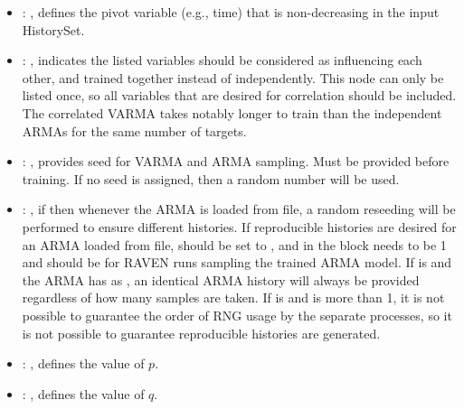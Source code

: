 \begin{itemize}
    \item {}: , 
      defines the pivot variable (e.g., time) that is non-decreasing in
      the input HistorySet.

    \item {}: , 
      indicates the listed variables                                                    should be
      considered as influencing each other, and trained together instead of independently.  This
      node                                                    can only be listed once, so all
      variables that are desired for correlation should be included.  \nb The
      correlated VARMA takes notably longer to train than the independent ARMAs for the same number
      of targets.

    \item {}: , 
      provides seed for VARMA and ARMA sampling.
      Must be provided before training. If no seed is assigned,
      then a random number will be used.

    \item {}: , 
      if  then whenever the ARMA is loaded from file, a
      random reseeding will be performed to ensure different histories. \nb If
      reproducible histories are desired for an ARMA loaded from file,
       should be set to , and in the
       block  needs to be 1
      and  should be
       for RAVEN runs sampling the trained ARMA model.
      If  is  and the ARMA has
       as , an identical ARMA history
      will always be provided regardless of how many samples are taken.
      If  is  and 
      is more than 1, it is not possible to guarantee the order of RNG usage by
      the separate processes, so it is not possible to guarantee reproducible
      histories are generated.

    \item {}: , 
      defines the value of $p$.

    \item {}: , 
      defines the value of $q$.


\end{itemize}
